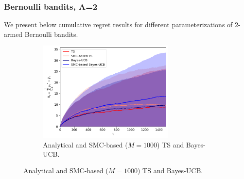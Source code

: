 
\subsubsection{Bernoulli bandits, A=2}
\label{asssec:static_bandits_bernoulli_2}

We present below cumulative regret results for different parameterizations of 2-armed Bernoulli bandits.

\begin{figure}[!h]
	\centering
	\begin{subfigure}[b]{\textwidth}
		\centering
		\includegraphics[width=0.75\textwidth]{./fods_figs/static/bernoulli/A2/theta0.1_0.2_M1000_cumulative_regret}
		\caption{Analytical and SMC-based ($M=1000$) TS and Bayes-UCB.}
	\end{subfigure}
	

\end{figure}
